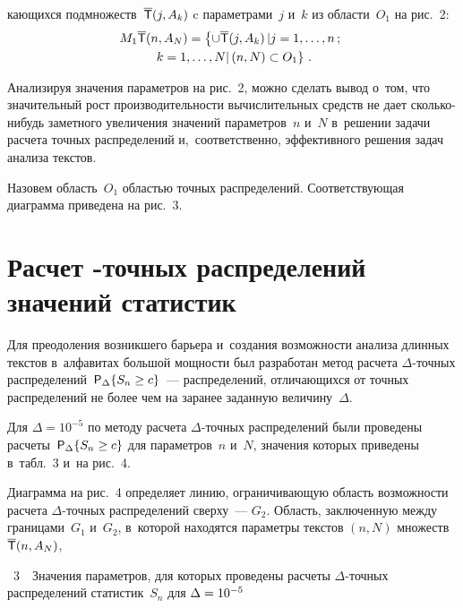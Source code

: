 \begin{multicols}{2}
\addtocounter{figure}{1}


\noindent
кающихся подмножеств~$\overline{\sf 
T}(j, A_k)$ c параметрами~$j$ и~$k$ из области~$O_1$ на рис.~2:
    \begin{multline*}
    M_1\overline{\sf T}(n,A_N) =\left\{ \cup \overline{\sf T} (j,A_k)\left\vert 
j=1,\ldots, n\,;\right.\right.\\ 
\left.\left.k=1,\ldots, N \right\vert (n,N)\subset O_1\right\}\,.
    \end{multline*}
    
    Анализируя значения параметров на рис.~2, можно сделать вывод 
о~том, что значительный рост производительности вычислительных 
средств не дает сколь\-ко-ни\-будь заметного увеличения значений 
параметров~$n$ и~$N$ в~решении задачи расчета точных распределений 
и,~соответственно, эффективного решения задач анализа текстов.
    
    Назовем область~$O_1$ областью точных распределений. 
Соответствующая диаграмма приведена на рис.~3.



\section{Расчет {\boldmath{$\Delta$}}-точных распределений 
значений статистик}

    Для преодоления возникшего барьера и~создания возможности 
анализа длинных текстов в~алфавитах большой мощности был разработан 
метод расчета $\Delta$-точ\-ных  
распределений~${\sf P}_\Delta\{S_n\hm\geq c\}$~--- распределений, отличающихся 
от точных распределений не более чем на заранее заданную 
величину~$\Delta$.
    
    Для $\Delta=10^{-5}$ по методу расчета $\Delta$-точ\-ных 
распределений были проведены расчеты~${\sf P}_\Delta\{S_n\hm\geq c\}$ для 
параметров~$n$ и~$N$, значения которых приведены в~табл.~3 и~на 
рис.~4.
    


    Диаграмма на рис.~4 определяет линию, ограничивающую область 
возможности расчета $\Delta$-точ\-ных распределений сверху~--- $G_2$. 
Область, заключенную между границами~$G_1$ и~$G_2$, в~которой 
находятся параметры текстов $(n, N)$ множеств~$\overline{\sf T}(n,A_N)$,\linebreak\vspace*{-12pt}

\columnbreak

\noindent
 {\small
 \begin{center} 
\parbox{66mm}{{{\tablename~3}\ \ \small{Значения параметров, для которых проведены расчеты $\Delta$-точ\-ных 
распределений статистик~$S_n$ для $\Delta\hm=10^{-5}$}}
}


\end{center}}
\end{multicols}
